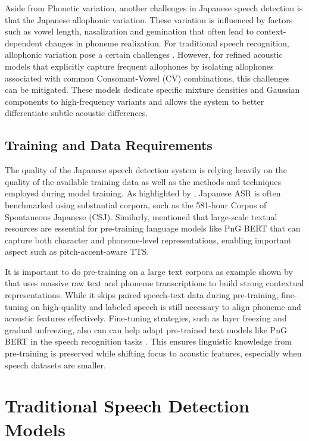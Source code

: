 Aside from Phonetic variation, another challenges in Japanese speech detection is that the Japanese allophonic variation. These variation is influenced by  factors such as vowel length, nasalization and gemination that  often lead to context-dependent changes in phoneme realization. For traditional speech recognition, allophonic variation pose a certain challenges \parencite{halpern2008role}. However, for refined acoustic models that explicitly capture frequent allophones by isolating allophones associated with common Consonant-Vowel (CV) combinations, this challenges can be mitigated. These models dedicate specific mixture densities and Gaussian components to high-frequency variants and allows the system to better differentiate subtle acoustic differences.

\subsection{Training and Data Requirements}
The quality of the Japanese speech detection system is relying heavily on the quality of the available training data as well as the methods and techniques employed during model training. As highlighted by \textcite{Karita2021} , Japanese ASR is often benchmarked using substantial corpora, such as the 581-hour Corpus of Spontaneous Japanese (CSJ). Similarly, \textcite{yasuda2022} mentioned that large-scale textual resources are essential for pre-training language models like PnG BERT that can capture both character and phoneme-level representations, enabling important aspect such as pitch-accent-aware TTS.

It is important to do pre-training on a large text corpora as example shown by \textcite{yasuda2022} that uses massive raw text and phoneme transcriptions to build strong contextual representations. While it skips paired speech-text data during pre-training, fine-tuning on high-quality and labeled speech is still necessary to align phoneme and acoustic features effectively. Fine-tuning strategies, such as layer freezing and gradual unfreezing, also can can help adapt pre-trained text models like PnG BERT in the speech recognition tasks \parencite{ardestani2024study}. This ensures linguistic knowledge from pre-training is preserved while shifting focus to acoustic features, especially when speech datasets are smaller. 


\section{Traditional Speech Detection Models } 
